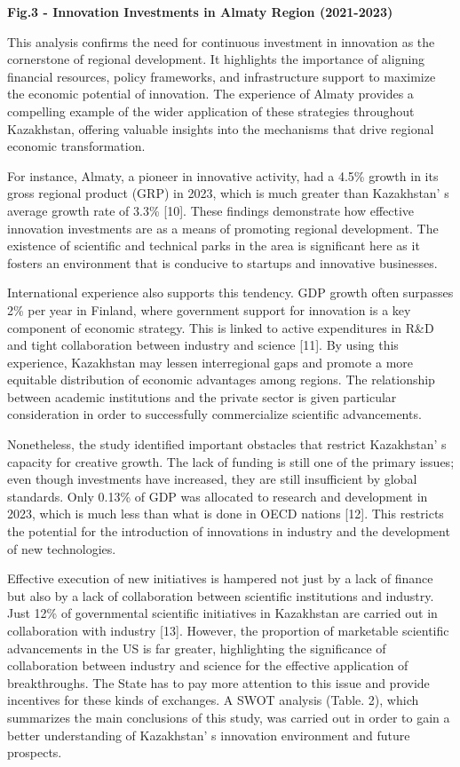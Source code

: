 {\bfseries Fig.3 - Innovation Investments in Almaty Region (2021-2023)}

This analysis confirms the need for continuous investment in innovation
as the cornerstone of regional development. It highlights the importance
of aligning financial resources, policy frameworks, and infrastructure
support to maximize the economic potential of innovation. The experience
of Almaty provides a compelling example of the wider application of
these strategies throughout Kazakhstan, offering valuable insights into
the mechanisms that drive regional economic transformation.

For instance, Almaty, a pioneer in innovative activity, had a 4.5\%
growth in its gross regional product (GRP) in 2023, which is much
greater than Kazakhstan' s average growth rate of 3.3\%
{[}10{]}. These findings demonstrate how effective innovation
investments are as a means of promoting regional development. The
existence of scientific and technical parks in the area is significant
here as it fosters an environment that is conducive to startups and
innovative businesses.

International experience also supports this tendency. GDP growth often
surpasses 2\% per year in Finland, where government support for
innovation is a key component of economic strategy. This is linked to
active expenditures in R\&D and tight collaboration between industry and
science {[}11{]}. By using this experience, Kazakhstan may lessen
interregional gaps and promote a more equitable distribution of economic
advantages among regions. The relationship between academic institutions
and the private sector is given particular consideration in order to
successfully commercialize scientific advancements.

Nonetheless, the study identified important obstacles that restrict
Kazakhstan' s capacity for creative growth. The lack of
funding is still one of the primary issues; even though investments have
increased, they are still insufficient by global standards. Only 0.13\%
of GDP was allocated to research and development in 2023, which is much
less than what is done in OECD nations {[}12{]}. This restricts the
potential for the introduction of innovations in industry and the
development of new technologies.

Effective execution of new initiatives is hampered not just by a lack of
finance but also by a lack of collaboration between scientific
institutions and industry. Just 12\% of governmental scientific
initiatives in Kazakhstan are carried out in collaboration with industry
{[}13{]}. However, the proportion of marketable scientific advancements
in the US is far greater, highlighting the significance of collaboration
between industry and science for the effective application of
breakthroughs. The State has to pay more attention to this issue and
provide incentives for these kinds of exchanges. A SWOT analysis (Table.
2), which summarizes the main conclusions of this study, was carried out
in order to gain a better understanding of Kazakhstan' s
innovation environment and future prospects.

